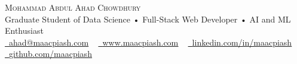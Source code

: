 \documentclass[11pt,a4paper]{article}
\newcommand{\resumeSubHeadingListStart}{\begin{itemize}[leftmargin=0.0in, label={}]}
\newcommand{\resumeSubHeadingListEnd}{\end{itemize}}
\begin{document}

\begin{center}
    {\Huge \scshape Mohammad Abdul Ahad Chowdhury} \\ \vspace{2pt}
    Graduate Student of Data Science • Full-Stack Web Developer • AI and ML Enthusiast \\ \vspace{2pt}
    \small \href{mailto:ahad@maacpiash.com}{\raisebox{-0.2\height}\faEnvelope\  \underline{ahad@maacpiash.com}} ~ \href{https://www.maacpiash.com}{\raisebox{-0.2\height}\faGlobe\ \underline{www.maacpiash.com}} ~ 
    \href{https://linkedin.com/in/maacpiash}{\raisebox{-0.2\height}\faLinkedin\ \underline{linkedin.com/in/maacpiash}}  ~
    \href{https://github.com/maacpiash}{\raisebox{-0.2\height}\faGithub\ \underline{github.com/maacpiash}}
    \vspace{-8pt}
\end{center}


\end{document}
